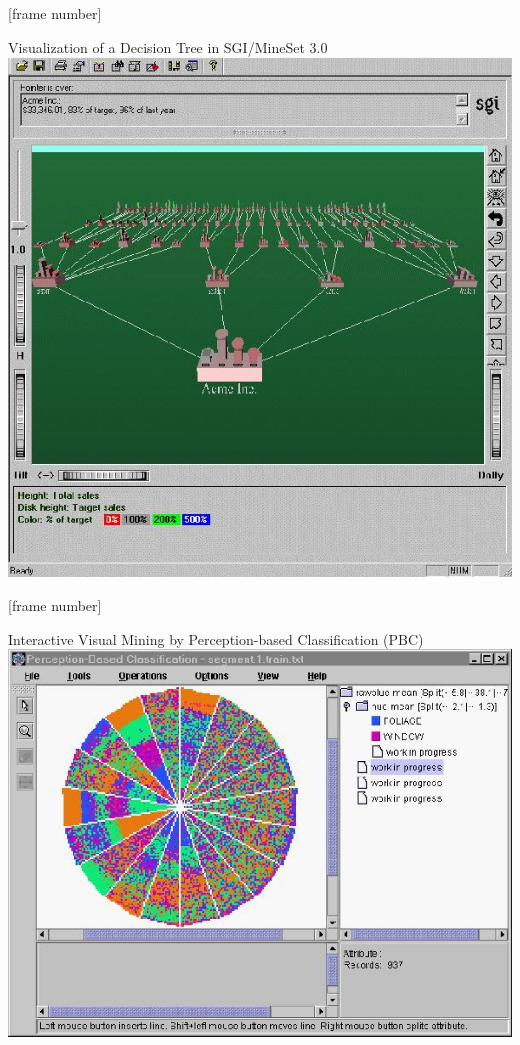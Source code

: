 \documentclass[aspectratio=169,t,table]{beamer}
\begin{document}
  {
    [frame number]
    \begin{frame}{Visualization of a Decision Tree in SGI/MineSet 3.0}
      \centering
      \includegraphics[height=0.9\textheight]{img/classification2.jpeg}
    \end{frame}
  }

  {
    [frame number]
    \begin{frame}{Interactive Visual Mining by Perception-based Classification (PBC)}
      \centering
      \includegraphics[height=0.9\textheight]{img/classification3.jpeg}
    \end{frame}
  }
\end{document}
